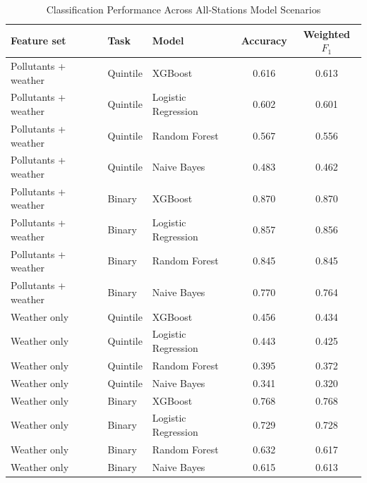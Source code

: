 \documentclass[stu,12pt,floatsintext]{apa7}
\begin{document}
\begin{table}[H]
  \begin{threeparttable}
  \caption{Classification Performance Across All-Stations Model Scenarios}
  \label{tab:classfull}
  \footnotesize
  \begin{tabular}{p{3.0cm}p{1.8cm}p{3.2cm}cc}
    \toprule
    \textbf{Feature set} & \textbf{Task} & \textbf{Model}
      & \textbf{Accuracy} & \textbf{Weighted $F_1$} \\
    \midrule
    Pollutants + weather & Quintile & XGBoost             & 0.616 & 0.613 \\
    Pollutants + weather & Quintile & Logistic Regression & 0.602 & 0.601 \\
    Pollutants + weather & Quintile & Random Forest       & 0.567 & 0.556 \\
    Pollutants + weather & Quintile & Naive Bayes         & 0.483 & 0.462 \\
    Pollutants + weather & Binary   & XGBoost             & 0.870 & 0.870 \\
    Pollutants + weather & Binary   & Logistic Regression & 0.857 & 0.856 \\
    Pollutants + weather & Binary   & Random Forest       & 0.845 & 0.845 \\
    Pollutants + weather & Binary   & Naive Bayes         & 0.770 & 0.764 \\
    Weather only         & Quintile & XGBoost             & 0.456 & 0.434 \\
    Weather only         & Quintile & Logistic Regression & 0.443 & 0.425 \\
    Weather only         & Quintile & Random Forest       & 0.395 & 0.372 \\
    Weather only         & Quintile & Naive Bayes         & 0.341 & 0.320 \\
    Weather only         & Binary   & XGBoost             & 0.768 & 0.768 \\
    Weather only         & Binary   & Logistic Regression & 0.729 & 0.728 \\
    Weather only         & Binary   & Random Forest       & 0.632 & 0.617 \\
    Weather only         & Binary   & Naive Bayes         & 0.615 & 0.613 \\
    \bottomrule
  \end{tabular}
  \end{threeparttable}
\end{table}
\end{document}
